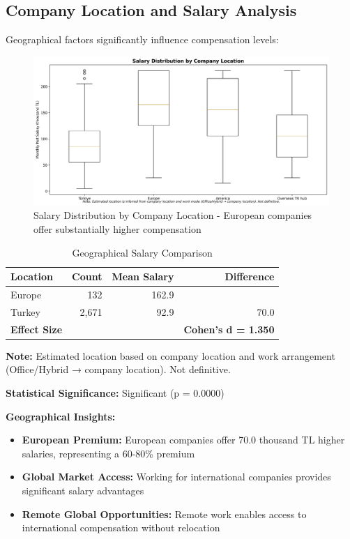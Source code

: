 \documentclass[12pt,a4paper]{article}
\begin{document}
\subsection{Company Location and Salary Analysis}
Geographical factors significantly influence compensation levels:

\begin{figure}[H]
    \centering
    \includegraphics[width=\textwidth]{figures/boxplot_company_location.png}
    \caption{Salary Distribution by Company Location - European companies offer substantially higher compensation}
\end{figure}

\begin{table}[H]
\centering
\begin{tabular}{lrrr}
\toprule
\textbf{Location} & \textbf{Count} & \textbf{Mean Salary} & \textbf{Difference} \\
\midrule
Europe & 132 & 162.9 & \\
Turkey & 2,671 & 92.9 & 70.0 \\
\midrule
\textbf{Effect Size} & & & \textbf{Cohen's d = 1.350} \\
\bottomrule
\end{tabular}
\caption{Geographical Salary Comparison}
\end{table}

\textbf{Note:} Estimated location based on company location and work arrangement (Office/Hybrid → company location). Not definitive.

\textbf{Statistical Significance:} Significant (p = 0.0000)

\textbf{Geographical Insights:}
\begin{itemize}
    \item \textbf{European Premium:} European companies offer 70.0 thousand TL higher salaries, representing a 60-80\% premium
    \item \textbf{Global Market Access:} Working for international companies provides significant salary advantages
    \item \textbf{Remote Global Opportunities:} Remote work enables access to international compensation without relocation
\end{itemize}
\end{document}
